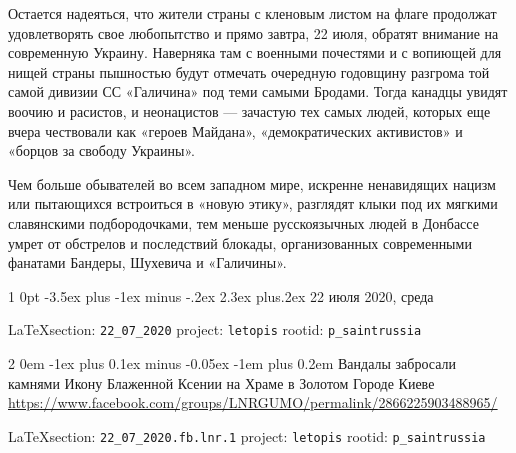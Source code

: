 \documentclass[a4paper,11pt]{extreport}
\makeatletter
\renewcommand\section{%
  \clearpage
  \@startsection{section}%
    {1}%
    {0pt}%
    {-3.5ex plus -1ex minus -.2ex}%
    {2.3ex plus.2ex}%
    {\centering\normalfont\Huge\bfseries}%
}
\renewcommand\subsection{%
  \clearpage
    \@startsection{subsection}%
    {2}%
    {0em}%
    {-1ex plus 0.1ex minus -0.05ex}%
    {-1em plus 0.2em}%
    {\scshape\bfseries\Large}%
}
\makeatother
\begin{document}
Остается надеяться, что жители страны с кленовым листом на флаге продолжат
удовлетворять свое любопытство и прямо завтра, 22 июля, обратят внимание на
современную Украину. Наверняка там с военными почестями и с вопиющей для нищей
страны пышностью будут отмечать очередную годовщину разгрома той самой дивизии
СС «Галичина» под теми самыми Бродами. Тогда канадцы увидят воочию и расистов,
и неонацистов --- зачастую тех самых людей, которых еще вчера чествовали как
«героев Майдана», «демократических активистов» и «борцов за свободу Украины».

Чем больше обывателей во всем западном мире, искренне ненавидящих нацизм или
пытающихся встроиться в «новую этику», разглядят клыки под их мягкими
славянскими подбородочками, тем меньше русскоязычных людей в Донбассе умрет от
обстрелов и последствий блокады, организованных современными фанатами Бандеры,
Шухевича и «Галичины».
  
 
 

\clearpage
\section{22 июля 2020, среда}
\label{sec:22_07_2020}

\vspace{0.5cm}
{\small\LaTeX section: \verb|22_07_2020| project: \verb|letopis| rootid: \verb|p_saintrussia|}
\vspace{0.5cm}

 
 

\subsection{Вандалы забросали камнями Икону Блаженной Ксении на Храме в Золотом Городе Киеве}
\label{sec:22_07_2020.fb.lnr.1}
\url{https://www.facebook.com/groups/LNRGUMO/permalink/2866225903488965/}

\vspace{0.5cm}
{\small\LaTeX section: \verb|22_07_2020.fb.lnr.1| project: \verb|letopis| rootid: \verb|p_saintrussia|}
\vspace{0.5cm}
\end{document}
